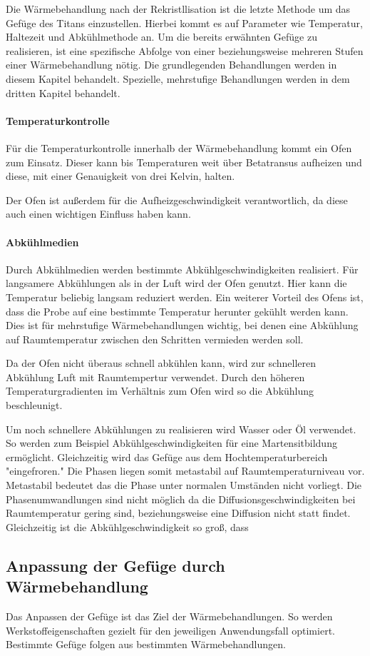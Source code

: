 \documentclass[a4paper, singlepage, 11pt]{tubsreprt}
\begin{document}
Die Wärmebehandlung nach der Rekristllisation ist die letzte Methode um das Gefüge des Titans einzustellen. Hierbei kommt es auf Parameter wie Temperatur, Haltezeit und Abkühlmethode an. Um die bereits erwähnten Gefüge zu realisieren, ist eine spezifische Abfolge von einer beziehungsweise mehreren Stufen einer Wärmebehandlung nötig. Die grundlegenden Behandlungen werden in diesem Kapitel behandelt. Spezielle, mehrstufige Behandlungen werden in dem dritten Kapitel behandelt.
\paragraph{Temperaturkontrolle}
Für die Temperaturkontrolle innerhalb der Wärmebehandlung kommt ein Ofen zum Einsatz. Dieser kann bis Temperaturen weit über Betatransus aufheizen und diese, mit einer Genauigkeit von drei Kelvin, halten. 

Der Ofen ist außerdem für die Aufheizgeschwindigkeit verantwortlich, da diese auch einen wichtigen Einfluss haben kann.
\paragraph{Abkühlmedien}

Durch Abkühlmedien werden bestimmte Abkühlgeschwindigkeiten realisiert. Für langsamere Abkühlungen als in der Luft wird der Ofen genutzt. Hier kann die Temperatur beliebig langsam reduziert werden. Ein weiterer Vorteil des Ofens ist, dass die Probe auf eine bestimmte Temperatur herunter gekühlt werden kann. Dies ist für mehrstufige Wärmebehandlungen wichtig, bei denen eine Abkühlung auf Raumtemperatur zwischen den Schritten vermieden werden soll. 

Da der Ofen nicht überaus schnell abkühlen kann, wird zur schnelleren Abkühlung Luft mit Raumtempertur verwendet. Durch den höheren Temperaturgradienten im Verhältnis zum Ofen wird so die Abkühlung beschleunigt.  

Um noch schnellere Abkühlungen zu realisieren wird Wasser oder Öl verwendet. So werden zum Beispiel Abkühlgeschwindigkeiten für eine Martensitbildung ermöglicht. Gleichzeitig wird das Gefüge aus dem Hochtemperaturbereich "eingefroren." Die Phasen liegen somit metastabil auf Raumtemperaturniveau vor. Metastabil bedeutet das die Phase unter normalen Umständen nicht vorliegt. Die Phasenumwandlungen sind nicht möglich da die Diffusionsgeschwindigkeiten bei Raumtemperatur gering sind, beziehungsweise eine Diffusion nicht statt findet. Gleichzeitig ist die Abkühlgeschwindigkeit so groß, dass 
\subsection*{Anpassung der Gefüge durch Wärmebehandlung}

Das Anpassen der Gefüge ist das Ziel der Wärmebehandlungen. So werden Werkstoffeigenschaften gezielt für den jeweiligen Anwendungsfall optimiert. Bestimmte Gefüge folgen aus bestimmten Wärmebehandlungen.


\end{document}
